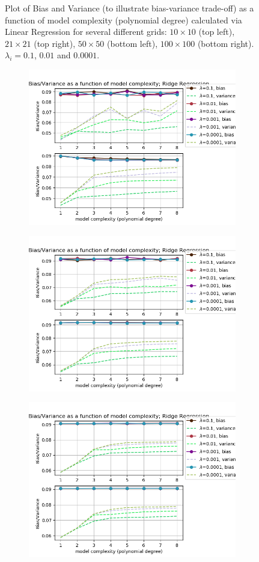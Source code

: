 \begin{figure}[!ht]
\begin{subfigure}{\textwidth}
\end{subfigure}
\caption{Plot of Bias and Variance (to illustrate bias-variance trade-off) as a function of model complexity (polynomial degree) calculated via Linear Regression for several different grids: $10\times10$ (top left), $21\times21$ (top right), $50\times50$ (bottom left), $100\times100$ (bottom right). $\lambda_i = 0.1$, $0.01$ and $0.0001$.}
\label{fig:linear-bias}
\end{figure}

 \begin{figure}[!ht]
\begin{subfigure}{\textwidth}
  \centering
  \includegraphics[width=0.55\linewidth]{images/bias_var/fake_ridge_bv_p08_n10.png}
\end{subfigure}
\begin{subfigure}{\textwidth}
  \centering
  \includegraphics[width=0.55\linewidth]{images/bias_var/fake_ridge_bv_p08_n21.png}
\end{subfigure}
\begin{subfigure}{\textwidth}
  \centering
  \includegraphics[width=0.55\linewidth]{images/bias_var/fake_ridge_bv_p08_n50.png}

\end{subfigure}
\end{figure}
